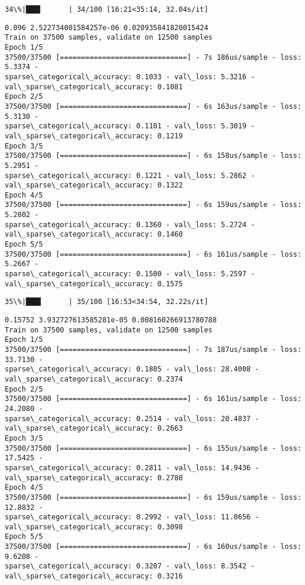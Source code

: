 \documentclass[11pt]{article}
\begin{document}
    \begin{Verbatim}[commandchars=\\\{\}]
 34\%|███▍      | 34/100 [16:21<35:14, 32.04s/it]
    \end{Verbatim}

    \begin{Verbatim}[commandchars=\\\{\}]
0.096 2.522734001584257e-06 0.020935841820015424
Train on 37500 samples, validate on 12500 samples
Epoch 1/5
37500/37500 [==============================] - 7s 186us/sample - loss: 5.3374 -
sparse\_categorical\_accuracy: 0.1033 - val\_loss: 5.3216 -
val\_sparse\_categorical\_accuracy: 0.1081
Epoch 2/5
37500/37500 [==============================] - 6s 163us/sample - loss: 5.3130 -
sparse\_categorical\_accuracy: 0.1101 - val\_loss: 5.3019 -
val\_sparse\_categorical\_accuracy: 0.1219
Epoch 3/5
37500/37500 [==============================] - 6s 158us/sample - loss: 5.2951 -
sparse\_categorical\_accuracy: 0.1221 - val\_loss: 5.2862 -
val\_sparse\_categorical\_accuracy: 0.1322
Epoch 4/5
37500/37500 [==============================] - 6s 159us/sample - loss: 5.2802 -
sparse\_categorical\_accuracy: 0.1360 - val\_loss: 5.2724 -
val\_sparse\_categorical\_accuracy: 0.1460
Epoch 5/5
37500/37500 [==============================] - 6s 161us/sample - loss: 5.2667 -
sparse\_categorical\_accuracy: 0.1500 - val\_loss: 5.2597 -
val\_sparse\_categorical\_accuracy: 0.1575
    \end{Verbatim}

    \begin{Verbatim}[commandchars=\\\{\}]
 35\%|███▌      | 35/100 [16:53<34:54, 32.22s/it]
    \end{Verbatim}

    \begin{Verbatim}[commandchars=\\\{\}]
0.15752 3.932727613585281e-05 0.008160266913780788
Train on 37500 samples, validate on 12500 samples
Epoch 1/5
37500/37500 [==============================] - 7s 187us/sample - loss: 33.7130 -
sparse\_categorical\_accuracy: 0.1805 - val\_loss: 28.4008 -
val\_sparse\_categorical\_accuracy: 0.2374
Epoch 2/5
37500/37500 [==============================] - 6s 161us/sample - loss: 24.2080 -
sparse\_categorical\_accuracy: 0.2514 - val\_loss: 20.4837 -
val\_sparse\_categorical\_accuracy: 0.2663
Epoch 3/5
37500/37500 [==============================] - 6s 155us/sample - loss: 17.5425 -
sparse\_categorical\_accuracy: 0.2811 - val\_loss: 14.9436 -
val\_sparse\_categorical\_accuracy: 0.2788
Epoch 4/5
37500/37500 [==============================] - 6s 159us/sample - loss: 12.8832 -
sparse\_categorical\_accuracy: 0.2992 - val\_loss: 11.0656 -
val\_sparse\_categorical\_accuracy: 0.3098
Epoch 5/5
37500/37500 [==============================] - 6s 160us/sample - loss: 9.6208 -
sparse\_categorical\_accuracy: 0.3207 - val\_loss: 8.3542 -
val\_sparse\_categorical\_accuracy: 0.3216
    \end{Verbatim}
\end{document}
